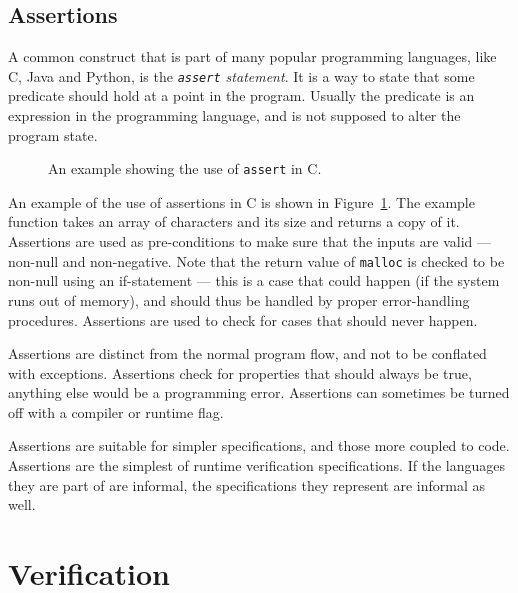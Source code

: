 \subsection{Assertions}

A common construct that is part of many popular programming languages, like C,
Java and Python, is the \textit{\texttt{assert} statement}. It is a way to
state that some predicate should hold at a point in the program. Usually the
predicate is an expression in the programming language, and is not supposed to
alter the program state.

\begin{figure}[h!]
	\begin{center}
	\begin{minipage}{0.7\textwidth}
    \lstset{language=C}
		
	\end{minipage}
	\end{center}
  \caption{An example showing the use of \texttt{assert} in C.}
	\label{figure-c-assert-example}
\end{figure}

An example of the use of assertions in C is shown in
Figure~\ref{figure-c-assert-example}. The example function takes an array of
characters and its size and returns a copy of it. Assertions are used as
pre-conditions to make sure that the inputs are valid --- non-null and
non-negative. Note that the return value of \texttt{malloc} is checked to be
non-null using an if-statement --- this is a case that could happen (if the
system runs out of memory), and should thus be handled by proper error-handling
procedures. Assertions are used to check for cases that should never happen.

Assertions are distinct from the normal program flow, and not to be conflated
with exceptions. Assertions check for properties that should always be true,
anything else would be a programming error. Assertions can sometimes be turned
off with a compiler or runtime flag.

Assertions are suitable for simpler specifications, and those more coupled to
code. Assertions are the simplest of runtime verification specifications. If
the languages they are part of are informal, the specifications they represent
are informal as well.



\section{Verification} \label{section-verification}

